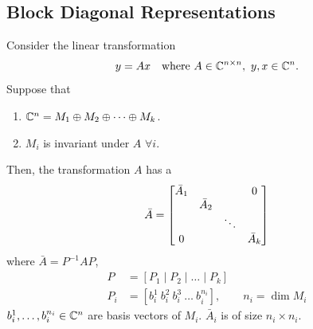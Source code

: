 \subsection{Block Diagonal Representations}\label{ss:block-diag}
\begin{theorem}
Consider the linear transformation
\[
y=Ax\quad\text{where }A\in\C^{n\times n},\ y,x\in\C^n.
\]
Suppose that
\begin{enumerate}[label=\roman*)]
\item $\mathbb{C}^n=M_1\oplus M_2\oplus\dots\oplus M_k$.
\item $M_i$ is invariant under $A$ $\forall i$.
\end{enumerate}
Then, the transformation $A$ has a 
\[
\bar{A}=\begin{bmatrix}\bar{A}_1&&&0\\&\bar{A}_2&&\\&&\ddots&\\0&&&\bar{A}_k\end{bmatrix}
\]
%
where $\bar{A}=P^{-1}AP$,
\begin{align*}
P&=[P_1\mid P_2\mid\dots\mid P_k]\\
P_i&=[b_i^1\ b_i^2\ b_i^3\ \dots\ b_i^{n_i}],\qquad n_i=\dim M_i
\end{align*}
$b_i^1,\dots,b_i^{n_i}\in\mathbb{C}^n$ are basis vectors of $M_i$. $\bar{A}_i$ is of size $n_i\times n_i$.
\end{theorem}

